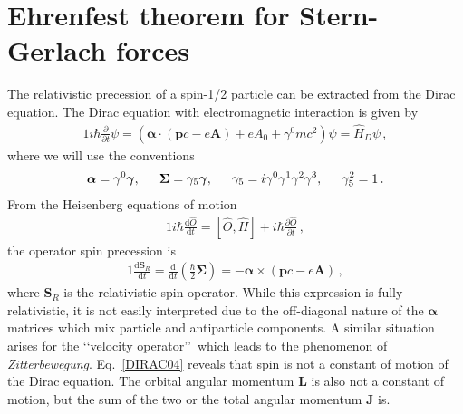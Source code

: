 \section{Ehrenfest theorem for Stern-Gerlach forces}
\noindent The relativistic precession of a spin-1/2 particle can be extracted from the Dirac equation. The Dirac equation with electromagnetic interaction is given by
\begin{alignat}{1}
  \label{DIRAC01} i\hbar\frac{\partial}{\partial t}\psi=\left(\boldsymbol{\alpha}\cdot\left(\mathbf{p}c-e\mathbf{A}\right)+eA_{0}+\gamma^{0}mc^{2}\right)\psi=\hat{H}_{D}\psi\,,
\end{alignat}
where we will use the conventions
\begin{alignat}{1}
  \label{DIRAC02} \boldsymbol{\alpha}=\gamma^{0}\boldsymbol{\gamma},\indent\boldsymbol{\Sigma}=\gamma_{5}\boldsymbol{\gamma},\indent\gamma_{5}=i\gamma^{0}\gamma^{1}\gamma^{2}\gamma^{3},\indent\gamma_{5}^{2}=1\,.
\end{alignat}
From the Heisenberg equations of motion
\begin{alignat}{1}
  \label{DIRAC03} i\hbar\frac{\mathrm{d}\hat{O}}{\mathrm{d}t}=[\hat{O},\hat{H}]+i\hbar\frac{\partial\hat{O}}{\partial t}\,,
\end{alignat}
the operator spin precession is
\begin{alignat}{1}
  \label{DIRAC04} \frac{\mathrm{d}\mathbf{S}_{R}}{\mathrm{d}t}=\frac{\mathrm{d}}{\mathrm{d}t}\left(\frac{\hbar}{2}\boldsymbol{\Sigma}\right)=-\boldsymbol{\alpha}\times\left(\mathbf{p}c-e\mathbf{A}\right)\,,
\end{alignat}
where $\mathbf{S}_{R}$ is the relativistic spin operator. While this expression is fully relativistic, it is not easily interpreted due to the off-diagonal nature of the $\boldsymbol{\alpha}$ matrices which mix particle and antiparticle components. A similar situation arises for the \lq\lq velocity operator\rq\rq\, which leads to the phenomenon of \emph{Zitterbewegung}. Eq.~\eqref{DIRAC04} reveals that spin is not a constant of motion of the Dirac equation. The orbital angular momentum $\mathbf{L}$ is also not a constant of motion, but the sum of the two or the total angular momentum $\mathbf{J}$ is.

